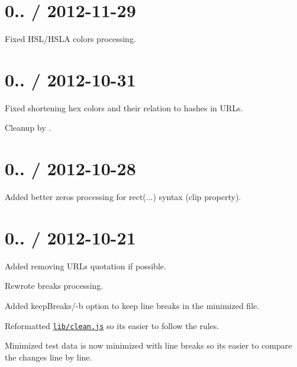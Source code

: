 \section*{0.. / 2012-\/11-\/29 }


\begin{DoxyItemize}
\item Fixed H\+S\+L/\+H\+S\+LA colors processing.
\end{DoxyItemize}

\section*{0.. / 2012-\/10-\/31 }


\begin{DoxyItemize}
\item Fixed shortening hex colors and their relation to hashes in U\+R\+Ls.
\item Cleanup by \href{https://github.com/XhmikosR}{\tt }.
\end{DoxyItemize}

\section*{0.. / 2012-\/10-\/28 }


\begin{DoxyItemize}
\item Added better zeros processing for {\ttfamily rect(...)} syntax (clip property).
\end{DoxyItemize}

\section*{0.. / 2012-\/10-\/21 }


\begin{DoxyItemize}
\item Added removing U\+R\+Ls quotation if possible.
\item Rewrote breaks processing.
\item Added {\ttfamily keep\+Breaks}/{\ttfamily -\/b} option to keep line breaks in the minimized file.
\item Reformatted \href{/lib/clean.js}{\tt lib/clean.\+js} so it\textquotesingle{}s easier to follow the rules.
\item Minimized test data is now minimized with line breaks so it\textquotesingle{}s easier to compare the changes line by line.
\end{DoxyItemize}

